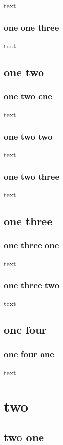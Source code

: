 \documentclass{book}
\begin{document}
text

\subsection{one one three}

text

\section{one two}

\localtableofcontents

\subsection{one two one}

text

\subsection{one two two}
text

\subsection{one two three}
text

\section{one three}

\subsection{one three one}

text

\subsection{one three two}

text

\section{one four}

\subsection{one four one}

text

\chapter{two}

\section{two one}
\end{document}

